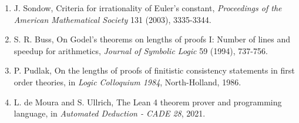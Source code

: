 \documentclass[
  a4paper,
  12pt]{ctexart}
\providecommand{\tightlist}{%
  \setlength{\itemsep}{0pt}\setlength{\parskip}{0pt}}
\begin{document}
\begin{enumerate}
\def\labelenumi{\arabic{enumi}.}
\tightlist
\item
  J. Sondow, Criteria for irrationality of Euler's constant,
  \emph{Proceedings of the American Mathematical Society} 131 (2003),
  3335-3344.
\item
  S. R. Buss, On Godel's theorems on lengths of proofs I: Number of
  lines and speedup for arithmetics, \emph{Journal of Symbolic Logic} 59
  (1994), 737-756.
\item
  P. Pudlak, On the lengths of proofs of finitistic consistency
  statements in first order theories, in \emph{Logic Colloquium 1984},
  North-Holland, 1986.
\item
  L. de Moura and S. Ullrich, The Lean 4 theorem prover and programming
  language, in \emph{Automated Deduction - CADE 28}, 2021.
\end{enumerate}
\end{document}
